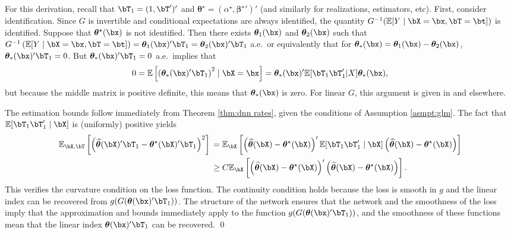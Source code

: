 \documentclass[12pt]{article}
\numberwithin{equation}{section}
\theoremstyle{definition}
\newcommand{\E}{\mathbb{E}}
\newcommand{\btheta}{\boldsymbol{\theta}}
\newcommand{\bbeta}{\boldsymbol{\beta}}
\newcommand{\bttrue}{\btheta^\star}
\newcommand{\atrue}{\alpha^\star}
\newcommand{\bbtrue}{\bbeta^\star}
\newcommand{\bthat}{\bm{\widehat{\theta}}}
\begin{document}
\begin{appendices}
For this derivation, recall that $\bT_1 = (1, \bT')'$ and $\bttrue = (\atrue, {\bbtrue}')'$ (and similarly for realizations, estimators, etc). First, consider identification. Since $G$ is invertible and conditional expectations are always identified, the quantity $G^{-1} ( \E[Y \mid \bX = \bx, \bT = \bt] )$ is identified. Suppose that $\bttrue(\bx)$ is not identified. Then there exists $\btheta_1(\bx)$ and $\btheta_2(\bx)$ such that $G^{-1} \left( \E[Y \mid \bX = \bx, \bT = \bt] \right) = \btheta_1(\bx)'\bT_1 = \btheta_2(\bx)'\bT_1$ a.e.\ or equivalently that for $\btheta_*(\bx)= \btheta_1(\bx) - \btheta_2(\bx)$, $\btheta_*(\bx)'\bT_1 = 0$.
But $\btheta_*(\bx)'\bT_1 = 0$ a.e.\ implies that
\[
    0 = \E\left[ \left(\btheta_*(\bx)'\bT_1\right)^2\mid \bX = \bx \right] = \btheta_*(\bx)' \E[\bT_1\bT_1' \vert X] \btheta_*(\bx),
\]
but because the middle matrix is positive definite, this means that $\btheta_*(\bx)$ is zero. For linear $G$, this argument is given in \citet{Huang-Shen2004_SJS} and elsewhere.


The estimation bounds follow immediately from Theorem \ref{thm:dnn rates}, given the conditions of Assumption \ref{asmpt:glm}. The fact that $\E[\bT_1\bT_1' \mid \bX]$ is (uniformly) positive yields
\begin{align*}
	\E_{\bX,\bT}  \left[ \left( \bthat(\bX)'\bT_1  - \bttrue(\bX)'\bT_1 \right)^2 \right] \textbf{}
    & = \E_{\bX}\left[ \left(\bthat(\bX) - \bttrue(\bX)\right)'\E[\bT_1\bT_1' \mid \bX]\left(\bthat(\bX) - \bttrue(\bX)\right) \right] \\
    & \geq C \E_{\bX}\left[ \left(\bthat(\bX) - \bttrue(\bX)\right)'\left(\bthat(\bX) - \bttrue(\bX)\right) \right].
\end{align*}
This verifies the curvature condition on the loss function. The continuity condition holds because the loss is smooth in $g$ and the linear index can be recovered from $g(G(\btheta(\bx)'\bT_1))$. The structure of the network ensures that the network and the smoothness of the loss imply that the approximation and bounds immediately apply to the function $g(G(\btheta(\bx)'\bT_1))$, and the smoothness of these functions mean that the linear index $\btheta(\bx)'\bT_1$ can be recovered.   \qed 















\end{appendices}
\end{document}
